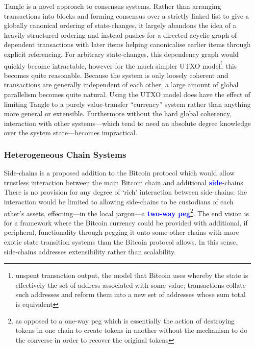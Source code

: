 \documentclass[t,usepdftitle=false]{beamer}
\renewcommand{\textit}[1]{\textcolor{blue}{\textbf{#1}}}
\begin{document}
\begin{frame}
Tangle \cite{iota2016tangle} is a novel approach to consensus systems. Rather than arranging transactions into blocks and forming consensus over a strictly linked list to give a globally canonical ordering of state-changes, it largely abandons the idea of a heavily structured ordering and instead pushes for a directed acyclic graph of dependent transactions with later items helping canonicalise earlier items through explicit referencing. For arbitrary state-changes, this dependency graph would quickly become intractable, however for the much simpler UTXO model\footnote{unspent transaction output, the model that Bitcoin uses whereby the state is effectively the set of address associated with some value; transactions collate such addresses and reform them into a new set of addresses whose sum total is equivalent} this becomes quite reasonable. Because the system is only loosely coherent and transactions are generally independent of each other, a large amount of global parallelism becomes quite natural. Using the UTXO model does have the effect of limiting Tangle to a purely value-transfer ``currency'' system rather than anything more general or extensible. Furthermore without the hard global coherency, interaction with other systems---which tend to need an absolute degree knowledge over the system state---becomes impractical.

\subsubsection{Heterogeneous Chain Systems}\label{heterogenous}

Side-chains \cite{blockstream2014sidechains} is a proposed addition to the Bitcoin protocol which would allow trustless interaction between the main Bitcoin chain and additional \textit{side}-chains. There is no provision for any degree of `rich' interaction between side-chains: the interaction would be limited to allowing side-chains to be custodians of each other's assets, effecting---in the local jargon---a \textit{two-way peg}\footnote{as opposed to a one-way peg which is essentially the action of destroying tokens in one chain to create tokens in another without the mechanism to do the converse in order to recover the original tokens}. The end vision is for a framework where the Bitcoin currency could be provided with additional, if peripheral, functionality through pegging it onto some other chains with more exotic state transition systems than the Bitcoin protocol allows. In this sense, side-chains addresses extensibility rather than scalability.


\end{frame}
\end{document}
